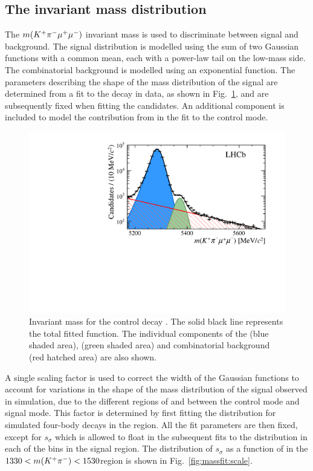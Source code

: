 \subsection{The \mkpimm invariant mass distribution}
\label{sec:kpimm:massfit}

The $m({{K}^+}{{\pi}^-}{\mu^+\mu^-})$ invariant mass is used to discriminate between signal and background. The signal distribution is modelled using the sum of two Gaussian functions with a common mean, each with a power-law tail on the low-mass side.  The combinatorial background is modelled using an exponential function.  The parameters describing the shape of the mass distribution of the signal are determined from a fit to the \BdToJPsiKstP decay in data, as shown in Fig.~\ref{fig:massfit}, and are subsequently fixed when fitting the \BdToKpimm candidates. An additional component is included to model the contribution from \BsToJPsiKst in the fit to the control mode. 

\begin{figure}[!tb]
\centering
\includegraphics[width=0.7\linewidth]{figs/kpimm/massfit/fit_jpsi_log.pdf}
\caption{Invariant mass \mkpimm for the control decay \BdToJPsiKst. The solid black line represents the total fitted function.  The individual components of the \BdToJPsiKst (blue shaded area), \BsToJPsiKst (green shaded area) and combinatorial background (red hatched area) are also shown.}
\label{fig:massfit}
\end{figure}

A single scaling factor is used to correct the width of the Gaussian functions to account for variations in the shape of the mass distribution of the signal observed in simulation, due to the different regions of \mkpi and \qsq between the control mode and signal mode. This factor is determined by first fitting the \mkpimm distribution for simulated four-body \BdToKpimm decays in the \BdToJPsiKstP region.  All the fit parameters are then fixed, except for $s_{\sigma}$ which is allowed to float in the subsequent fits to the \mkpimm distribution in each of the \qsq bins in the \BdToKpimm signal region. The distribution of $s_{\sigma}$ as a function of \qsq in the $1330<m({{K}^+}{{\pi}^-})<1530$\mevcc region is shown in Fig.~\ref{fig:massfit:scale}.  %

